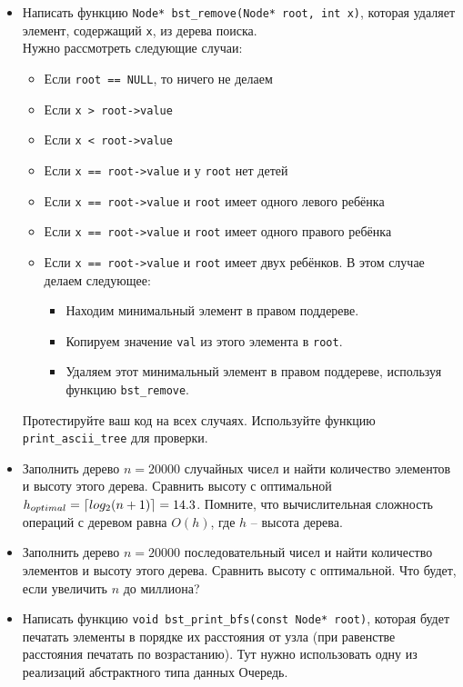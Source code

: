 \documentclass{article}
\DeclarePairedDelimiter\ceil{\lceil}{\rceil}
\begin{document}
\begin{itemize}
\item Написать функцию \texttt{Node* bst\_remove(Node* root, int x)}, которая удаляет элемент, содержащий \texttt{x}, из дерева поиска.\\
Нужно рассмотреть следующие случаи:
\begin{itemize}
\item Если \texttt{root == NULL}, то ничего не делаем
\item Если \texttt{x > root->value}
\item Если \texttt{x < root->value}
\item Если \texttt{x == root->value} и у \texttt{root} нет детей
\item Если \texttt{x == root->value} и \texttt{root} имеет одного левого ребёнка
\item Если \texttt{x == root->value} и \texttt{root} имеет одного правого ребёнка
\item Если \texttt{x == root->value} и \texttt{root} имеет двух ребёнков. В этом случае делаем следующее:
	\begin{itemize}
	\item Находим минимальный элемент в правом поддереве.
	\item Копируем значение \texttt{val} из этого элемента в \texttt{root}.
	\item Удаляем этот минимальный элемент в правом поддереве, используя функцию \texttt{bst\_remove}.
	\end{itemize}
\end{itemize}
Протестируйте ваш код на всех случаях. Используйте функцию \texttt{print\_ascii\_tree} для проверки.

\item Заполнить дерево $n = 20000$ случайных чисел и найти количество элементов и высоту этого дерева. Сравнить высоту с оптимальной $h_{optimal} = \ceil*{log_2(n + 1)} = 14.3$. Помните, что вычислительная сложность операций с деревом равна $O(h)$, где $h$ -- высота дерева.
\item Заполнить дерево  $n = 20000$ последовательный чисел и найти количество элементов и высоту этого дерева. Сравнить высоту с оптимальной. Что будет, если увеличить $n$ до миллиона?

\item Написать функцию \texttt{void bst\_print\_bfs(const Node* root)}, которая будет печатать элементы в порядке их расстояния от узла (при равенстве расстояния печатать по возрастанию). Тут нужно использовать одну из реализаций абстрактного типа данных Очередь.
\end{itemize}
\iffalse
\newpage
\end{document}
